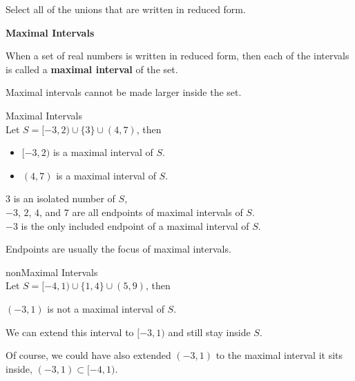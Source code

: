 \documentclass{ximera}
\begin{document}
\begin{question}
Select all of the unions that are written in reduced form.
  \begin{selectAll}
  \choice {$[-3, 4) \cup (2, 7)$}
  \choice {$(-3, 2] \cup [4, 7] \cup \{ 3 \}$}
  \choice [correct]{$[-3, 2) \cup \{ 3 \} \cup (4, 7)$}
  \choice {$(4, 7) \cup [-3, 2)$}
  \end{selectAll}
\end{question}




\begin{definition} \textbf{\textcolor{green!50!black}{Maximal Intervals}}

When a set of real numbers is written in reduced form, then each of the intervals is called a \textbf{maximal interval} of the set.
\end{definition}
Maximal intervals cannot be made larger inside the set.  


\begin{example} Maximal Intervals \\
Let $S = [-3, 2) \cup \{ 3 \} \cup (4, 7)$, then

\begin{itemize}
\item $[-3, 2)$ is a maximal interval of $S$.
\item $(4, 7)$ is a maximal interval of $S$.
\end{itemize}


$3$ is an isolated number of $S$, \\

$-3$, $2$, $4$, and $7$ are all endpoints of maximal intervals of $S$. \\

$-3$ is the only included endpoint of a maximal interval of $S$.



\end{example}
Endpoints are usually the focus of maximal intervals.







\begin{example} nonMaximal Intervals \\
Let $S = [-4, 1) \cup \{ 1, 4 \} \cup (5, 9)$, then


$(-3, 1)$ is not a maximal interval of $S$.

We can extend this interval to $[-3, 1)$ and still stay inside $S$.


\end{example}
Of course, we could have also extended $(-3, 1)$ to the maximal interval it sits inside, $(-3, 1) \subset [-4, 1)$. \\
\end{document}
